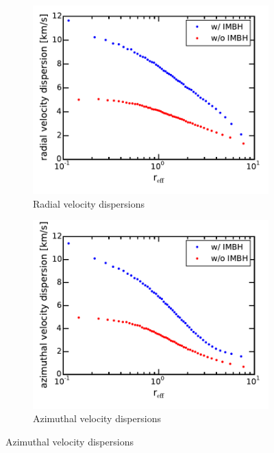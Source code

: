 \documentclass[a4paper,12pt,abstracton]{scrartcl}
\begin{document}
\begin{figure}[htbp]
	\centering
	\begin{subfigure}{0.475\textwidth}
		\centering
		\includegraphics[width=\textwidth]{Plots/radial_velocity_dispersion.pdf}
		\caption{Radial velocity dispersions}
		\label{[fig:radial_vel_disp]}
	\end{subfigure}
	\hfill
	\begin{subfigure}{0.475\textwidth}
		\centering
		\includegraphics[width=\textwidth]{Plots/azimuthal_velocity_dispersion.pdf}
		\caption{Azimuthal velocity dispersions}
		\label{[fig:azimuthal_vel_disp]}
	\end{subfigure}

\end{figure}
\end{document}
